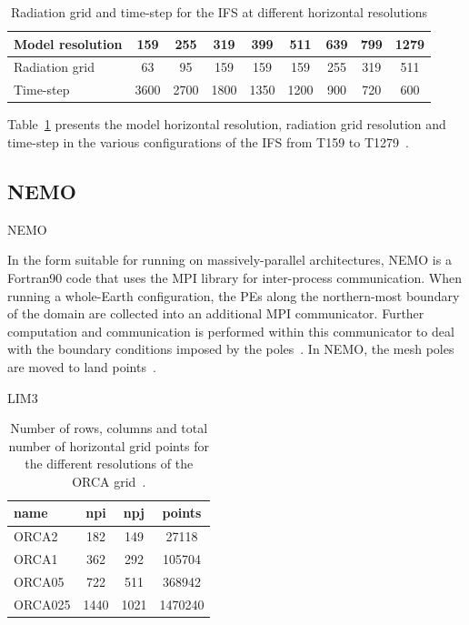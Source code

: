 \begin{table}[h!]
\centering       
\begin{tabular}{|l|c|c|c|c|c|c|c|c|}
    \hline 
    Model resolution & 159 & 255 & 319 & 399 & 511 & 639 & 799 & 1279 \\
    \hline
    Radiation grid & 63 & 95 & 159 & 159 & 159 & 255 & 319 & 511 \\
    Time-step & 3600 & 2700 & 1800 & 1350 & 1200 & 900 & 720 & 600 \\
    \hline
\end{tabular} 
\caption{Radiation grid and time-step for the IFS at different horizontal resolutions} 
\label{tab:ifs-grid}
\end{table}
Table~\ref{tab:ifs-grid} presents the model horizontal resolution, radiation grid resolution and time-step in the various configurations of the IFS from T159 to T1279~\cite{1399454274743}.



\subsection{NEMO}

\gls{NEMO} ~\cite{nemo-book36}

In the form suitable for running on massively-parallel architectures, \gls{NEMO} is a Fortran90 code that uses the MPI library for inter-process
communication. When running a whole-Earth configuration, the PEs along the northern-most boundary of the domain are collected into an additional \gls{MPI} communicator. Further
computation and communication is performed within this communicator to deal with the boundary conditions imposed by the poles~\cite{nemo-report}. In NEMO, the mesh poles are moved to land points~\cite{ref1}.

LIM3~\cite{lim36,gmd-8-2991-2015}





\begin{table}[h!]
\centering
\begin{tabular}{|l|c|c|c|}
    \hline 
    name    & npi  & npj  & points  \\
    \hline   
    ORCA2   & 182  & 149  & 27118   \\
    ORCA1   & 362  & 292  & 105704  \\
    ORCA05  & 722  & 511  & 368942  \\
    ORCA025 & 1440 & 1021 & 1470240 \\
    \hline
\end{tabular}
\caption{Number of rows, columns and total number of horizontal grid points for the different resolutions of the ORCA grid~\cite{oriol14}.}
\label{tab:nemo-grid}
\end{table}

